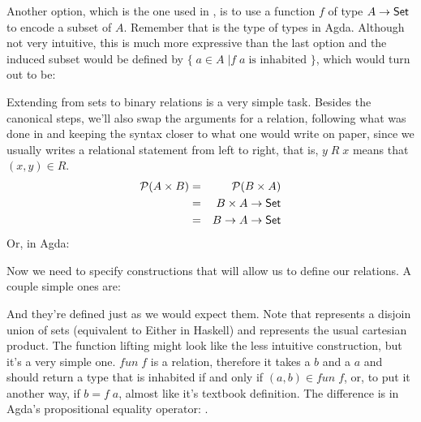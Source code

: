 Another option, which is the one used in \cite{Jansson09}, is to use a function $f$
of type $A \rightarrow \D{Set}$ to encode a subset of $A$. Remember that  is
the type of types in Agda. Although not very intuitive, this is much more expressive than the 
last option and the induced subset would be defined by $\{\; a \in A\; | f\;a\;\text{is inhabited }\}$,
which would turn out to be:


Extending from sets to binary relations is a very simple task. Besides the canonical steps,
we'll also swap the arguments for a relation, following what was done in \cite{Jansson09} and
keeping the syntax closer to what one would write on paper, since we usually writes a relational
statement from left to right, that is, $y\;R\;x$ means that $(x, y) \in R$.
\begin{eqnarray*}
  \powerset (A \times B) & = & \powerset (B \times A)\\
                         & = & B \times A \rightarrow \D{Set}\\
                         & = & B \rightarrow A \rightarrow \D{Set}
\end{eqnarray*}
Or, in Agda:


Now we need to specify constructions that will allow us to define our relations. A couple simple
ones are:


And they're defined just as we would expect them. Note that  represents a disjoin union of sets
(equivalent to Either in Haskell) and  represents the usual cartesian product. The function
lifting might look like the less intuitive construction, but it's a very simple one. $fun\;f$ is a relation,
therefore it takes a $b$ and a $a$ and should return a type that is inhabited if and only if $(a, b) \in fun\;f$,
or, to put it another way, if $b = f\;a$, almost like it's textbook definition. The difference is in
Agda's propositional equality operator: .  


